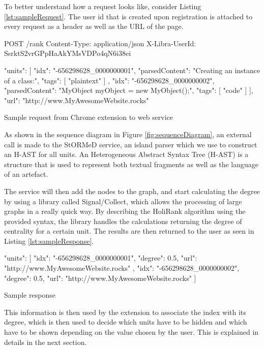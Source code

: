 To better understand how a request looks like, consider Listing \ref{lst:sampleRequest}. The user id that is created upon registration is attached to every request as a header as well as the URL of the page. 
\begin{listing}[H]
\centering	
\begin{jsoncode}
POST /rank
Content-Type: application/json
X-Libra-UserId: SsrktS2vrGPpHaAkYMsVDPo4qN6i38ei

{
  "units": [
    {
      "idx": "-656298628_0000000001",
      "parsedContent": "Creating an instance of a class:",
      "tags": [
        "plaintext"
      ]
    },
    {
      "idx": "-656298628_0000000002",
      "parsedContent": "MyObject myObject = new MyObject();",
      "tags": [
        "code"
      ]
    }
  ],
  "url": "http://www.MyAwesomeWebsite.rocks"
}
\end{jsoncode}
\caption{Sample request from Chrome extension to web service}
\label{lst:sampleRequest}
\end{listing}

As shown in the sequence diagram in Figure \ref{fig:sequenceDiagram}, an external call is made to the StORMeD service, an island parser which we use to construct an H-AST for all units. An Heterogeneous Abstract Syntax Tree (H-AST)\cite{Ponz2015} is a structure that is used to represent both textual fragments as well as the language of an artefact. 

The service will then add the nodes to the graph, and start calculating the degree by using a library called Signal/Collect\cite{Stutz:2010:SGA:1940281.1940330}, which allows the processing of large graphs in a really quick way. By describing the HoliRank\cite{Ponz2017b} algorithm using the provided syntax, the library handles the calculations returning the degree of centrality for a certain unit. The results are then returned to the user as seen in Listing \ref{lst:sampleResponse}.

\begin{listing}
\centering	
\begin{jsoncode}
{
  "units": [
    {
      "idx": "-656298628_0000000001",
      "degree": 0.5,
      "url": "http://www.MyAwesomeWebsite.rocks"
    },
    {
      "idx": "-656298628_0000000002",
      "degree": 0.5,
      "url": "http://www.MyAwesomeWebsite.rocks"
    }
  ]
}
\end{jsoncode}
\caption{Sample response}
\label{lst:sampleResponse}
\end{listing}

This information is then used by the extension to associate the index with its degree, which is then used to decide which units have to be hidden and which have to be shown depending on the value chosen by the user. This is explained in details in the next section.

